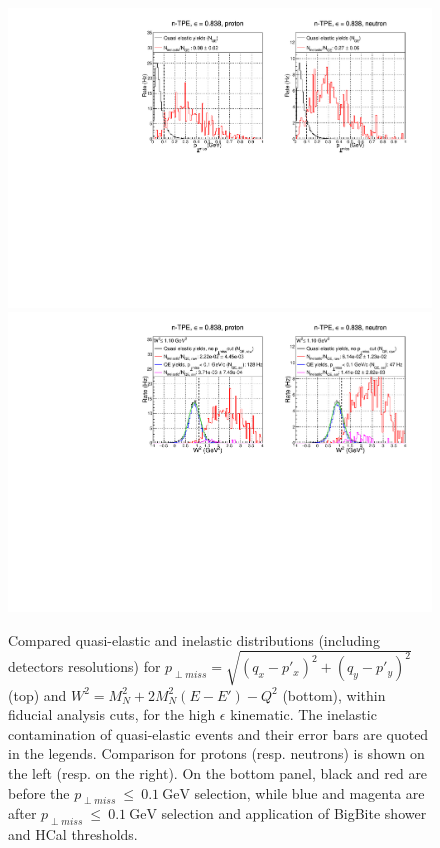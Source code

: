 \documentclass[11pt]{article}
\begin{document}
%
\begin{figure}[h]
  \centering
    \includegraphics[width=12cm]{gen-tpe_he_pperp_acc_real.pdf}
    \includegraphics[width=12cm]{gen-tpe_he_W2_acc_real.pdf}
    \caption{Compared quasi-elastic and inelastic distributions (including detectors resolutions) for $p_{\perp miss} = \sqrt{(q_{x}-p'_{x})^2+(q_{y}-p'_{y})^2}$ (top) and $W^2 = M_{N}^2+2M_{N}^{2}(E-E')-Q^2$ (bottom), within fiducial analysis cuts, for the high $\epsilon$ kinematic. The inelastic contamination of quasi-elastic events and their error bars are quoted in the legends. Comparison for protons (resp. neutrons) is shown on the left (resp. on the right). On the bottom panel, black and red are before the $p_{\perp miss}~\leq~0.1~\mathrm{GeV}$ selection, while blue and magenta are after $p_{\perp miss}~\leq~0.1~\mathrm{GeV}$ selection and application of BigBite shower and HCal thresholds.}
    \label{fig:inel_contam_he}
\end{figure}
%
\end{document}
